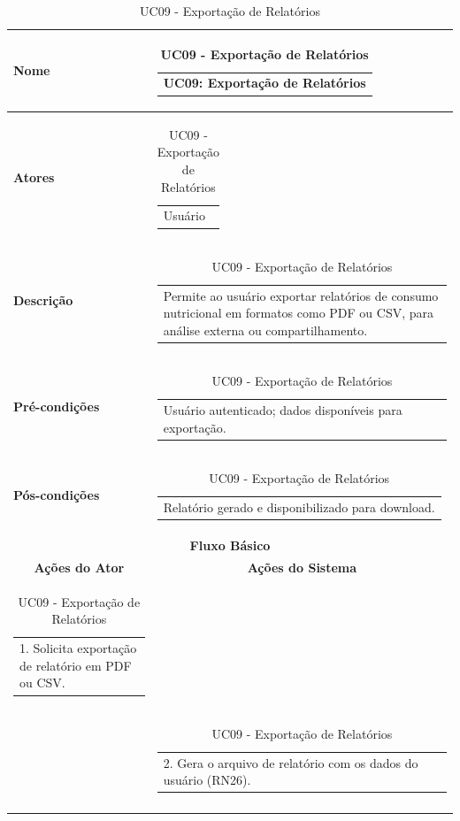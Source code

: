 \begin{longtable}[c]{|p{}|p{}|}
\caption{UC09 - Exportação de Relatórios}
\label{tab:uc09}\\
\hline
\multicolumn{1}{|p{0.48\textwidth}|}{\textbf{Nome}} &
  \begin{tabular}[c]{@{}p{}@{}}UC09: Exportação de Relatórios\end{tabular} \\ \hline
\endfirsthead
\endhead

\multicolumn{1}{|p{0.48\textwidth}|}{\textbf{Atores}} &
  \begin{tabular}[c]{@{}p{}@{}}Usuário\end{tabular} \\ \hline
\multicolumn{1}{|p{0.48\textwidth}|}{\textbf{Descrição}} &
  \begin{tabular}[c]{@{}p{}@{}}Permite ao usuário exportar relatórios de consumo nutricional em formatos como PDF ou CSV, para análise externa ou compartilhamento.\end{tabular} \\ \hline
\multicolumn{1}{|p{0.48\textwidth}|}{\textbf{Pré-condições}} &
  \begin{tabular}[c]{@{}p{}@{}}Usuário autenticado; dados disponíveis para exportação.\end{tabular} \\ \hline
\multicolumn{1}{|p{0.48\textwidth}|}{\textbf{Pós-condições}} &
  \begin{tabular}[c]{@{}p{}@{}}Relatório gerado e disponibilizado para download.\end{tabular} \\ \hline
\multicolumn{2}{|c|}{\textbf{Fluxo Básico}} \\ \hline
\multicolumn{1}{|c|}{\textbf{Ações do Ator}} &
  \multicolumn{1}{c|}{\textbf{Ações do Sistema}} \\ \hline
\multicolumn{1}{|p{0.48\textwidth}|}{\begin{tabular}[c]{@{}p{}@{}}1. Solicita exportação de relatório em PDF ou CSV.\end{tabular}} & \\ \hline
\multicolumn{1}{|p{0.48\textwidth}|}{} &
  \begin{tabular}[c]{@{}p{}@{}}2. Gera o arquivo de relatório com os dados do usuário (RN26).\end{tabular} \\ \hline
\multicolumn{1}{|p{0.48\textwidth}|}{} &

\end{longtable}
